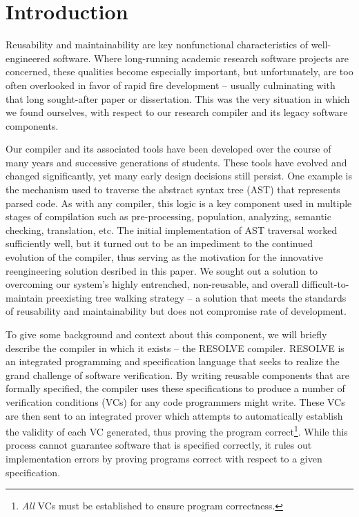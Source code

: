 \documentclass[times]{speauth}
\begin{document}

\section{Introduction}
\vspace{-2pt}
Reusability and maintainability are key nonfunctional characteristics of well-engineered software. Where long-running academic research software projects are concerned, these qualities become especially important, but unfortunately, are too often overlooked in favor of rapid fire development -- usually culminating with that long sought-after paper or dissertation. This was the very situation in which we found ourselves, with respect to our research compiler and its legacy software components.

Our compiler and its associated tools have been developed over the course of many years and successive generations of students. These tools have evolved and changed significantly, yet many early design decisions still persist. One example is the mechanism used to traverse the abstract syntax tree (AST) that represents parsed code. As with any compiler, this logic is a key component used in multiple stages of compilation such as pre-processing, population, analyzing, semantic checking, translation, etc. The initial implementation of AST traversal worked sufficiently well, but it turned out to be an impediment to the continued evolution of the compiler, thus serving as the motivation for the innovative reengineering solution desribed in this paper. We sought out a solution to overcoming our system's highly entrenched, non-reusable, and overall difficult-to-maintain preexisting tree walking strategy -- a solution that meets the standards of reusability and maintainability but does not compromise rate of development.

To give some background and context about this component, we will briefly describe the compiler in which it exists -- the RESOLVE compiler. RESOLVE is an integrated programming and specification language that seeks to realize the grand challenge of software verification. By writing reusable components that are formally specified, the compiler uses these specifications to produce a number of verification conditions (VCs) for any code programmers might write. These VCs are then sent to an integrated prover which attempts to automatically establish the validity of each VC generated, thus proving the program correct\footnote{\textit{All} VCs must be established to ensure program correctness.}. While this process cannot guarantee software that is specified correctly, it rules out implementation errors by proving programs correct with respect to a given specification.
\end{document}

